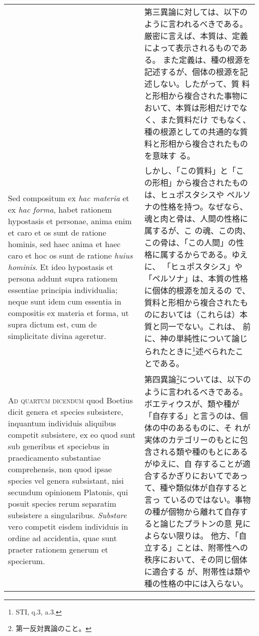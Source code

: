 \documentclass[10pt]{jsarticle} %
\begin{document}
\begin{longtable}{p{21em}p{21em}}
&

第三異論に対しては、以下のように言われるべきである。
厳密に言えば、本質は、定義によって表示されるものである。
また定義は、種の根源を記述するが、個体の根源を記述しない。したがって、質
 料と形相から複合された事物において、本質は形相だけでなく、また質料だけ
 でもなく、種の根源としての共通的な質料と形相から複合されたものを意味す
 る。


\\


Sed
compositum ex {\itshape hac materia} et ex {\itshape hac forma}, habet rationem hypostasis et
personae, anima enim et caro et os sunt de ratione hominis, sed haec
anima et haec caro et hoc os sunt de ratione {\itshape huius hominis}. Et ideo
hypostasis et persona addunt supra rationem essentiae principia
individualia; neque sunt idem cum essentia in compositis ex materia et
forma, ut supra dictum est, cum de simplicitate divina ageretur.


&

しかし、「この質料」と「この形相」から複合されたものは、ヒュポスタシスや
 ペルソナの性格を持つ。なぜなら、魂と肉と骨は、人間の性格に属するが、こ
 の魂、この肉、この骨は、「この人間」の性格に属するからである。ゆえに、
 「ヒュポスタシス」や「ペルソナ」は、本質の性格に個体的根源を加えるの
 で、質料と形相から複合されたものにおいては（これらは）本質と同一でない。これは、
 前に、神の単純性について論じられたときに\footnote{STI, q.3, a.3.}述べられたことである。


\\




{\scshape Ad quartum dicendum} quod Boetius dicit genera et species subsistere,
inquantum individuis aliquibus competit subsistere, ex eo quod sunt sub
generibus et speciebus in praedicamento substantiae comprehensis, non
quod ipsae species vel genera subsistant, nisi secundum opinionem
Platonis, qui posuit species rerum separatim subsistere a
singularibus. {\itshape Substare} vero competit eisdem individuis in ordine ad
accidentia, quae sunt praeter rationem generum et specierum.

&


第四異論\footnote{第一反対異論のこと。}については、以下のように言われるべきである。
ボエティウスが、類や種が「自存する」と言うのは、個体の中のあるものに、そ
 れが実体のカテゴリーのもとに包含される類や種のもとにあるがゆえに、自
 存することが適合するかぎりにおいてであって、種や類似体が自存すると言っ
 ているのではない。事物の種が個物から離れて自存すると論じたプラトンの意
 見によらない限りは。
他方、「自立する」ことは、附帯性への秩序において、その同じ個体に適合する
 が、附帯性は類や種の性格の中には入らない。



\end{longtable}
\end{document}
